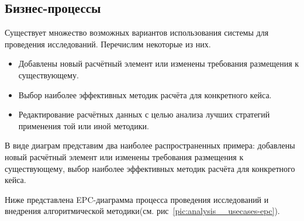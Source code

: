 \subsection{\Large{Бизнес-процессы}}

Существует множество возможных вариантов использования системы для проведения исследований.
Перечислим некоторые из них.
\begin{itemize}
	\item Добавлены новый расчётный элемент или изменены требования размещения к существующему.
	\item Выбор наиболее эффективных методик расчёта для конкретного кейса.
	\item Редактирование расчётных данных с целью анализа лучших стратегий применения той или иной методики.
\end{itemize}

В виде диаграм представим два наиболее распространенных примера: добавлены новый расчётный элемент
или изменены требования размещения к существующему, выбор наиболее эффективных методик расчёта для конкретного кейса.

Ниже представлена EPC-диаграмма процесса проведения исследований и
внедрения алгоритмической методики(см. рис\ \ref{pic:analysis__usecases-epc}).

